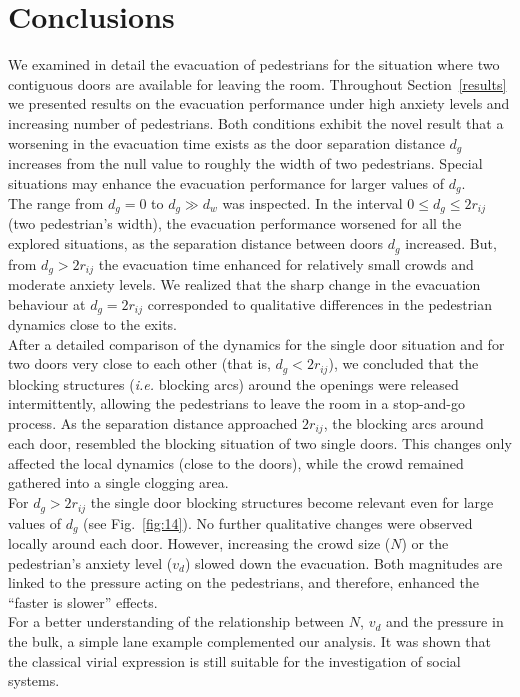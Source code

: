 \section{\label{conclusions}Conclusions}


We examined in detail the evacuation of pedestrians for the situation where 
two contiguous doors are available for leaving the room. Throughout  
Section~\ref{results} we presented results on the evacuation performance under 
high anxiety levels and increasing number of pedestrians. Both conditions 
exhibit the novel result that a worsening in the evacuation time exists as the door 
separation distance $d_g$ increases from the null value to roughly the width of 
two pedestrians. Special situations may enhance the evacuation performance for 
larger values of $d_g$. \\

The range from $d_g=0$ to $d_g\gg d_w$ was inspected. 
In the interval $0\leq d_g \leq 2r_{ij}$ (two pedestrian's width), the evacuation 
performance worsened for all the explored situations, as the separation
distance between doors $d_g$ increased. But, from $d_g > 2r_{ij}$ the 
evacuation time enhanced for relatively small crowds and moderate anxiety
levels. We realized that the sharp change in the evacuation behaviour at
$d_g=2r_{ij}$ corresponded to qualitative differences in 
the pedestrian dynamics close to the exits.\\

After a detailed comparison of the dynamics for the single door situation and 
for two doors very close to each other (that is, $d_g<2r_{ij}$), we concluded that 
the blocking structures (\emph{i.e.} blocking arcs) around the openings were 
released intermittently, allowing the pedestrians to leave the room in a 
stop-and-go process. As the separation distance approached $2r_{ij}$, the 
blocking arcs around each door, resembled the blocking 
situation of two single doors. This changes only affected the 
local dynamics (close to the doors), while the crowd remained gathered into a 
single clogging area. \\

For $d_g>2r_{ij}$ the single door blocking structures become relevant even for 
large values of $d_g$ (see Fig.~\ref{fig:14}). No further qualitative changes 
were observed locally around each door. However, increasing the crowd size ($N$) 
or the pedestrian's anxiety level ($v_d$) slowed down the evacuation. Both 
magnitudes are linked to the pressure acting on the pedestrians, and therefore, 
enhanced the ``faster is slower'' effects. \\

For a better understanding of the relationship between $N$, $v_d$ and the 
pressure in the bulk, a simple lane example complemented our analysis. It was 
shown that the classical virial expression is still suitable for the 
investigation of social systems.  \\


